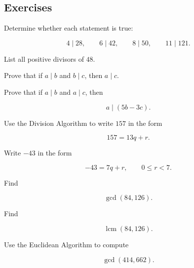 \subsection{Exercises}
\label{subsec:elementary-number-theory-exercises}

\begin{exercise}[1]
Determine whether each statement is true:

\[ 4\mid28,\qquad6\mid42,\qquad8\mid50,\qquad11\mid121. \]
\end{exercise}

\begin{exercise}[1]
List all positive divisors of \(48\).
\end{exercise}

\begin{exercise}[2]
Prove that if \(a\mid b\) and \(b\mid c\), then \(a\mid c\).
\end{exercise}

\begin{exercise}[2]
Prove that if \(a\mid b\) and \(a\mid c\), then

\[ a\mid(5b-3c). \]
\end{exercise}

\begin{exercise}[1]
Use the Division Algorithm to write \(157\) in the form

\[ 157=13q+r. \]
\end{exercise}

\begin{exercise}[2]
Write \(-43\) in the form

\[ -43=7q+r,\qquad0\leq r<7. \]
\end{exercise}

\begin{exercise}[1]
Find

\[ \gcd(84,126). \]
\end{exercise}

\begin{exercise}[1]
Find

\[ \operatorname{lcm}(84,126). \]
\end{exercise}

\begin{exercise}[2]
Use the Euclidean Algorithm to compute

\[ \gcd(414,662). \]
\end{exercise}


